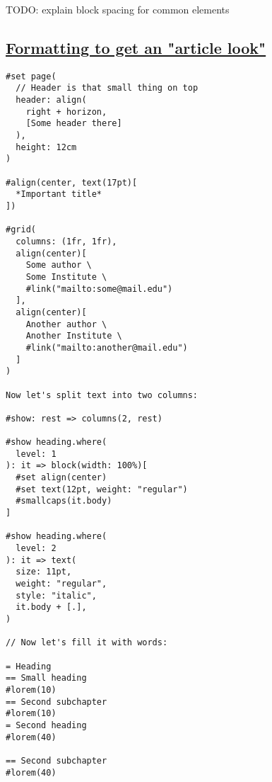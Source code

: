 TODO: explain block spacing for common elements

\subsection{\texorpdfstring{\hyperref[formatting-to-get-an-article-look]{Formatting
to get an "article
look"}}{Formatting to get an "article look"}}\label{formatting-to-get-an-article-look}

\begin{verbatim}
#set page(
  // Header is that small thing on top
  header: align(
    right + horizon,
    [Some header there]
  ),
  height: 12cm
)

#align(center, text(17pt)[
  *Important title*
])

#grid(
  columns: (1fr, 1fr),
  align(center)[
    Some author \
    Some Institute \
    #link("mailto:some@mail.edu")
  ],
  align(center)[
    Another author \
    Another Institute \
    #link("mailto:another@mail.edu")
  ]
)

Now let's split text into two columns:

#show: rest => columns(2, rest)

#show heading.where(
  level: 1
): it => block(width: 100%)[
  #set align(center)
  #set text(12pt, weight: "regular")
  #smallcaps(it.body)
]

#show heading.where(
  level: 2
): it => text(
  size: 11pt,
  weight: "regular",
  style: "italic",
  it.body + [.],
)

// Now let's fill it with words:

= Heading
== Small heading
#lorem(10)
== Second subchapter
#lorem(10)
= Second heading
#lorem(40)

== Second subchapter
#lorem(40)
\end{verbatim}

\pandocbounded{}
